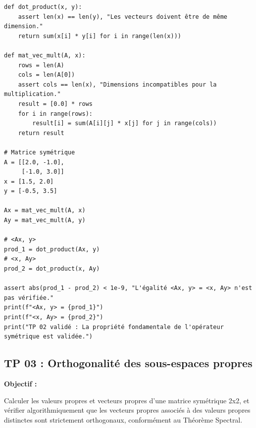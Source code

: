 \documentclass[11pt,a4paper]{article}
\begin{document}
\begin{lstlisting}
def dot_product(x, y):
    assert len(x) == len(y), "Les vecteurs doivent être de même dimension."
    return sum(x[i] * y[i] for i in range(len(x)))

def mat_vec_mult(A, x):
    rows = len(A)
    cols = len(A[0])
    assert cols == len(x), "Dimensions incompatibles pour la multiplication."
    result = [0.0] * rows
    for i in range(rows):
        result[i] = sum(A[i][j] * x[j] for j in range(cols))
    return result

# Matrice symétrique
A = [[2.0, -1.0],
     [-1.0, 3.0]]
x = [1.5, 2.0]
y = [-0.5, 3.5]

Ax = mat_vec_mult(A, x)
Ay = mat_vec_mult(A, y)

# <Ax, y>
prod_1 = dot_product(Ax, y)
# <x, Ay>
prod_2 = dot_product(x, Ay)

assert abs(prod_1 - prod_2) < 1e-9, "L'égalité <Ax, y> = <x, Ay> n'est pas vérifiée."
print(f"<Ax, y> = {prod_1}")
print(f"<x, Ay> = {prod_2}")
print("TP 02 validé : La propriété fondamentale de l'opérateur symétrique est validée.")
\end{lstlisting}

\subsection*{TP 03 : Orthogonalité des sous-espaces propres}

\textbf{Objectif :}

Calculer les valeurs propres et vecteurs propres d'une matrice symétrique 2x2, et vérifier algorithmiquement que les vecteurs propres associés à des valeurs propres distinctes sont strictement orthogonaux, conformément au Théorème Spectral.
\end{document}

